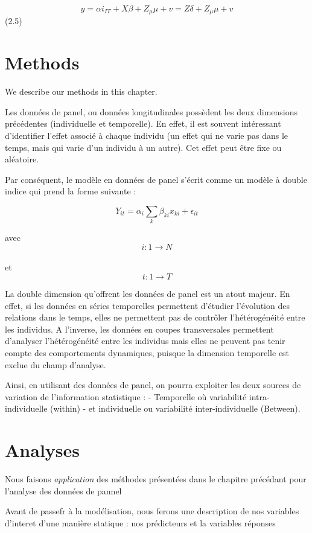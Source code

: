 \documentclass[
]{book}
\begin{document}
\[ y=\alpha i_{IT} + X\beta + Z_\mu \mu +v = Z\delta + Z_\mu \mu +v    \] (2.5)

\hypertarget{methods}{%
\chapter{Methods}\label{methods}}

We describe our methods in this chapter.

Les données de panel, ou données longitudinales possèdent les deux dimensions précédentes (individuelle et temporelle). En effet, il est souvent intéressant d'identifier l'effet associé à chaque individu (un effet qui ne varie pas dans le temps, mais qui varie d'un individu à un autre). Cet effet peut être fixe ou aléatoire.

Par conséquent, le modèle en données de panel s'écrit comme un modèle à double indice qui prend la forme suivante :

\[ Y_{it}= \alpha_i\sum_{k}\beta_{ki}x_{ki}+ \epsilon_{it} \]

avec
\[ i:1 \rightarrow N \]\\
et
\[ t:1 \rightarrow T \]

La double dimension qu'offrent les données de panel est un atout majeur. En effet, si les données en séries temporelles permettent d'étudier l'évolution des relations dans le temps, elles ne permettent pas de contrôler l'hétérogénéité entre les individus. A l'inverse, les données en coupes transversales permettent d'analyser l'hétérogénéité entre les individus mais elles ne peuvent pas tenir compte des comportements dynamiques, puisque la dimension temporelle est exclue du champ d'analyse.

Ainsi, en utilisant des données de panel, on pourra exploiter les deux sources de variation de l'information statistique :
- Temporelle où variabilité intra-individuelle (within)
- et individuelle ou variabilité inter-individuelle (Between).

\hypertarget{analyses}{%
\chapter{Analyses}\label{analyses}}

Nous faisons \emph{application} des méthodes présentées dans le chapitre précédant pour l'analyse des données de pannel

Avant de passefr à la modélisation, nous ferons une description de nos variables d'interet d'une manière statique : nos prédicteurs et la variables réponses
\end{document}
